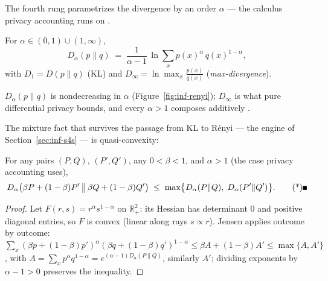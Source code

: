 The fourth rung parametrizes the divergence by an order $\alpha$ --- the calculus
privacy accounting runs on \citep{information-theory-bg3, information-theory-bg4}.

\begin{definition}\label{def:inf-renyi}
For $\alpha \in (0,1) \cup (1,\infty)$,
\[
D_\alpha(p\|q) \;=\; \frac{1}{\alpha - 1}\,
\ln \sum_x p(x)^{\alpha}\, q(x)^{1-\alpha},
\]
with $D_1 = D(p\|q)$ (KL) and
$D_\infty = \ln\max_x \frac{p(x)}{q(x)}$ (\emph{max-divergence}).
\end{definition}

\begin{proposition}\label{prop:inf-renyicalc}
$D_\alpha(p\|q)$ is nondecreasing in $\alpha$ (Figure~\ref{fig:inf-renyi}); $D_\infty$
is what pure differential privacy bounds, and every $\alpha > 1$ composes additively
\citep{information-theory-bg4, information-theory-bg5}. \eop
\end{proposition}

The mixture fact that survives the passage from KL to R\'enyi --- the engine of
Section~\ref{sec:inf-s4s} --- is quasi-convexity:

\begin{lemma}\label{lem:inf-quasiconvex}
For any pairs $(P, Q)$, $(P', Q')$, any $0 < \beta < 1$, and $\alpha > 1$ (the case
privacy accounting uses),
\[
D_\alpha\bigl(\beta P + (1-\beta)P' \,\big\|\, \beta Q + (1-\beta)Q'\bigr)
\;\le\; \max\bigl\{ D_\alpha(P\|Q),\; D_\alpha(P'\|Q') \bigr\}. \eopm
\]
\end{lemma}

\begin{proof}
Let $F(r,s) = r^\alpha s^{1-\alpha}$ on $\mathbb{R}_+^2$: its Hessian has determinant
$0$ and positive diagonal entries, so $F$ is convex (linear along rays $s \propto r$).
Jensen applies outcome by outcome: $\sum_x (\beta p + (1-\beta)p')^\alpha(\beta q +
(1-\beta)q')^{1-\alpha} \le \beta A + (1-\beta)A' \le \max\{A, A'\}$, with
$A = \sum_x p^\alpha q^{1-\alpha} = e^{(\alpha-1)D_\alpha(P\|Q)}$, similarly $A'$;
dividing exponents by $\alpha - 1 > 0$ preserves the inequality.
\end{proof}

